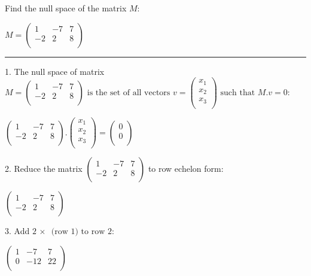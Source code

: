 \documentclass{article}
\begin{document}
\pagebreak

Find the null space of the matrix $M:$

$M=\left(
\begin{array}{ccc}
1 & -7 & 7 \\
 -2 & 2 & 8 \\
\end{array}
\right)$

\hrule

1. The null space of matrix $M=\left(
\begin{array}{ccc}
1 & -7 & 7 \\
 -2 & 2 & 8 \\
\end{array}
\right)\text{ is the set of all vectors }v=\left(
\begin{array}{c}
x_1 \\
 x_2 \\
 x_3 \\
\end{array}
\right)\text{ such that }M.v=0:$

$\left(
\begin{array}{ccc}
1 & -7 & 7 \\
 -2 & 2 & 8 \\
\end{array}
\right).\left(
\begin{array}{c}
x_1 \\
 x_2 \\
 x_3 \\
\end{array}
\right)=\left(
\begin{array}{c}
0 \\
 0 \\
\end{array}
\right)$

2. Reduce the matrix $\left(
\begin{array}{ccc}
1 & -7 & 7 \\
 -2 & 2 & 8 \\
\end{array}
\right)$ to row echelon form:

$\left(
\begin{array}{ccc}
1 & -7 & 7 \\
 -2 & 2 & 8 \\
\end{array}
\right)$

3. Add $2\, \times \,\text{ (row }1)\text{ to row }2:$

$\left(
\begin{array}{ccc}
1 & -7 & 7 \\
 0 & -12 & 22 \\
\end{array}
\right)$
\end{document}
